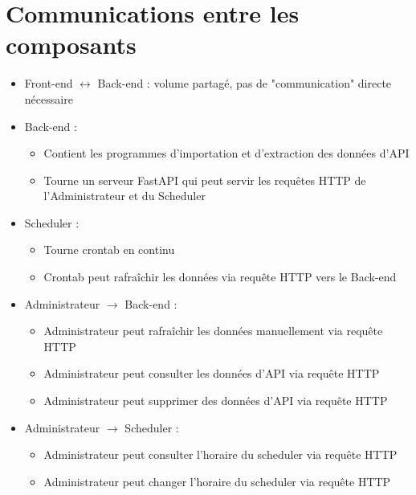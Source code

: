 \section*{Communications entre les composants}
\begin{itemize}
    \item[$\bullet$] Front-end $\longleftrightarrow$ Back-end : volume partagé, pas de "communication" directe nécessaire

    \item[$\bullet$] Back-end :
        \begin{itemize}
        \item[$\circ$] Contient les programmes d'importation et d'extraction des données d'API
        \item[$\circ$] Tourne un serveur FastAPI qui peut servir les requêtes HTTP de l'Administrateur et du Scheduler
        \end{itemize}

    \item[$\bullet$] Scheduler :
        \begin{itemize}
        \item[$\circ$] Tourne crontab en continu
        \item[$\circ$] Crontab peut rafraîchir les données via requête HTTP vers le Back-end
        \end{itemize}

    \item[$\bullet$] Administrateur $\rightarrow$ Back-end :
        \begin{itemize}
        \item[$\circ$] Administrateur peut rafraîchir les données manuellement via requête HTTP
        \item[$\circ$] Administrateur peut consulter les données d'API via requête HTTP
        \item[$\circ$] Administrateur peut supprimer des données d'API via requête HTTP
        \end{itemize}

    \item[$\bullet$] Administrateur $\rightarrow$ Scheduler :
        \begin{itemize}
        \item[$\circ$] Administrateur peut consulter l'horaire du scheduler via requête HTTP
        \item[$\circ$] Administrateur peut changer l'horaire du scheduler via requête HTTP
        \end{itemize}
\end{itemize}
